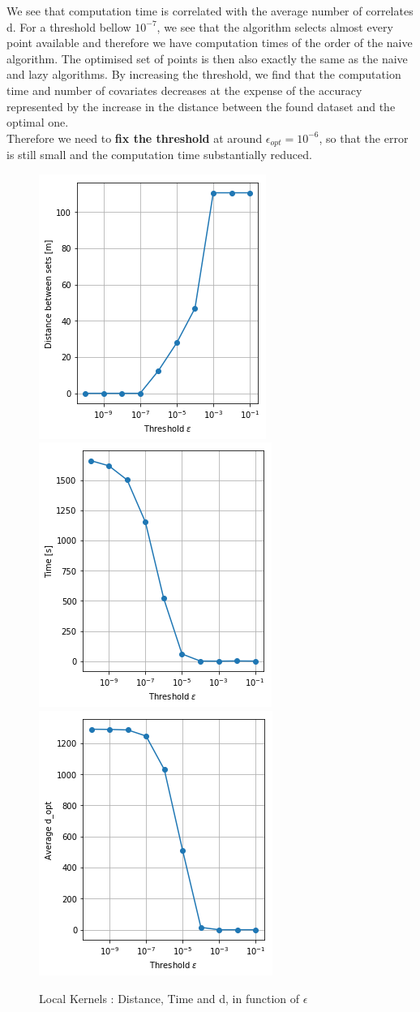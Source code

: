 We see that computation time is correlated with the average number of correlates d. For a threshold bellow $10^{-7}$, we see that the algorithm selects almost every point available and therefore we have computation times of the order of the naive algorithm. The optimised set of points is then also exactly the same as the naive and lazy algorithms. By increasing the threshold, we find that the computation time and number of covariates decreases at the expense of the accuracy represented by the increase in the distance between the found dataset and the optimal one.  \\

Therefore we need to \textbf{fix the threshold} at around $ \epsilon_{opt} = 10^{-6}$, so that the error is still small and the computation time substantially reduced. \\ 



\begin{figure}
\centering
\includegraphics[height=0.33\linewidth]{figures/CompAlg/3rd/non_centered_60.35.0/comp_dist}
~
\includegraphics[height=0.33\linewidth]{figures/CompAlg/3rd/non_centered_60.35.0/comp_Time}
~
\includegraphics[height=0.33\linewidth]{figures/CompAlg/3rd/non_centered_60.35.0/comp_d_opt}
\caption{Local Kernels : Distance, Time and d, in function of $\epsilon$}
\end{figure}

